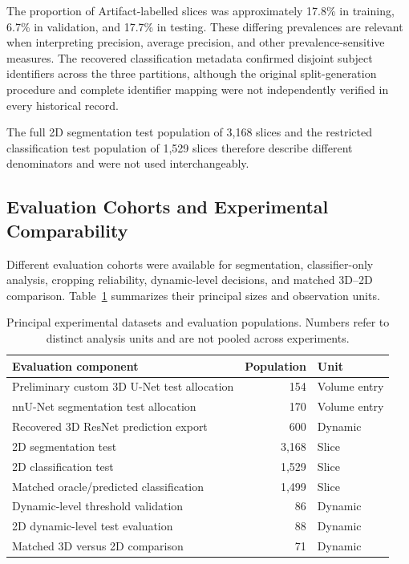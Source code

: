 The proportion of Artifact-labelled slices was approximately 17.8\% in training, 6.7\% in validation, and 17.7\% in testing. These differing prevalences are relevant when interpreting precision, average precision, and other prevalence-sensitive measures. The recovered classification metadata confirmed disjoint subject identifiers across the three partitions, although the original split-generation procedure and complete identifier mapping were not independently verified in every historical record.

The full 2D segmentation test population of 3,168 slices and the restricted classification test population of 1,529 slices therefore describe different denominators and were not used interchangeably.

\subsection{Evaluation Cohorts and Experimental Comparability}
\label{subsec:results_evaluation_cohorts}

Different evaluation cohorts were available for segmentation, classifier-only analysis, cropping reliability, dynamic-level decisions, and matched 3D--2D comparison. Table~\ref{tab:results_cohorts} summarizes their principal sizes and observation units.

\begin{table}[htbp]
\centering
\caption{Principal experimental datasets and evaluation populations. Numbers refer to distinct analysis units and are not pooled across experiments.}
\label{tab:results_cohorts}
\begin{tabular}{p{}rl}
\hline
Evaluation component & Population & Unit \\
\hline
Preliminary custom 3D U-Net test allocation & 154 & Volume entry \\
nnU-Net segmentation test allocation & 170 & Volume entry \\
Recovered 3D ResNet prediction export & 600 & Dynamic \\
2D segmentation test & 3,168 & Slice \\
2D classification test & 1,529 & Slice \\
Matched oracle/predicted classification & 1,499 & Slice \\
Dynamic-level threshold validation & 86 & Dynamic \\
2D dynamic-level test evaluation & 88 & Dynamic \\
Matched 3D versus 2D comparison & 71 & Dynamic \\
\hline
\end{tabular}
\end{table}

